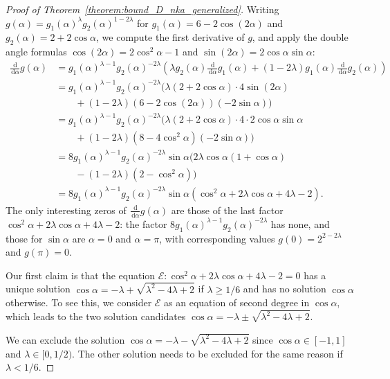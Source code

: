\documentclass[runningheads,orivec]{llncs}
\newcommand{\dd}{\,\mathrm d}
\let\geq=\geqslant
\begin{document}
\begin{proof}[Proof of Theorem~\ref{theorem:bound_D_nka_generalized}]
        Writing $g(\alpha)=g_1(\alpha)^{\lambda}g_2(\alpha)^{1-2\lambda}$ for $g_1(\alpha)=6-2\cos(2\alpha)$ and $g_2(\alpha)=2+2\cos\alpha$, we compute the first derivative of $g$, and apply the double angle formulas $\cos(2\alpha)=2\cos^2\alpha-1$ and $\sin(2\alpha)=2\cos\alpha\sin\alpha$:
        \begin{align*}
             \frac{\dd}{\dd\alpha}g(\alpha)&=g_1(\alpha)^{\lambda-1}g_2(\alpha)^{-2\lambda}\left(\lambda g_2(\alpha)\frac{\dd}{\dd\alpha}g_1(\alpha)+(1-2\lambda)g_1(\alpha)\frac{\dd}{\dd\alpha}g_2(\alpha)\right)\\
             &=g_1(\alpha)^{\lambda-1}g_2(\alpha)^{-2\lambda}(\lambda(2+2\cos\alpha)\cdot4\sin(2\alpha)\\
    		 &\qquad+(1-2\lambda)(6-2\cos(2\alpha))(-2\sin\alpha))\\
             &=g_1(\alpha)^{\lambda-1}g_2(\alpha)^{-2\lambda}\big(\lambda(2+2\cos\alpha)\cdot4\cdot2\cos\alpha\sin\alpha\\
    		 &\qquad+(1-2\lambda)\left(8-4\cos^2\alpha\right)(-2\sin\alpha)\big)\\
             &=8g_1(\alpha)^{\lambda-1}g_2(\alpha)^{-2\lambda}\sin\alpha\big(2\lambda \cos\alpha(1+\cos\alpha)\\
    		 &\qquad-(1-2\lambda)\left(2-\cos^2\alpha\right)\big)\\
             &=8g_1(\alpha)^{\lambda-1}g_2(\alpha)^{-2\lambda}\sin\alpha\left(\cos^2\alpha+2\lambda\cos\alpha+4\lambda-2\right).
        \end{align*}
        The only interesting zeros of $\frac{\dd}{\dd\alpha}g(\alpha)$ are those of the last factor $\cos^2\alpha+2\lambda\cos\alpha+4\lambda-2$: the factor $8g_1(\alpha)^{\lambda-1}g_2(\alpha)^{-2\lambda}$ has none, and those for $\sin\alpha$ are $\alpha=0$ and $\alpha=\pi$, with corresponding values $g(0)=2^{2-2\lambda}$ and $g(\pi)=0$.
        
        Our first claim is that the equation $\mathcal E:\cos^2\alpha+2\lambda\cos\alpha+4\lambda-2=0$ has a unique solution $\cos\alpha=-\lambda+\sqrt{\lambda^2-4\lambda+2}$ if $\lambda\geq 1/6$ and has no solution $\cos\alpha$ otherwise. To see this, we consider $\mathcal E$ as an equation of second degree in $\cos\alpha$, which leads to the two solution candidates $\cos\alpha=-\lambda\pm\sqrt{\lambda^2-4\lambda+2}$.
         
        We can exclude the solution $\cos\alpha=-\lambda-\sqrt{\lambda^2-4\lambda+2}$ since $\cos\alpha\in[-1,1]$ and $\lambda\in [0,1/2)$. 
        The other solution needs to be excluded for the same reason if $\lambda<1/6$.
    

\end{proof}
\end{document}
